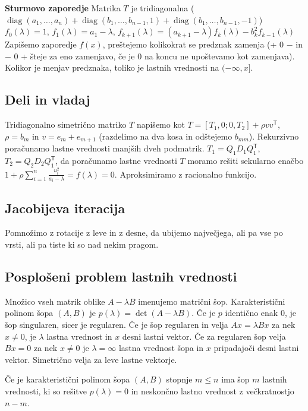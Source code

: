 \documentclass[a4paper,10pt]{article}
\theoremstyle{definition}
\newcommand{\T}{\mathsf{T}\!}
\DeclareMathOperator{\diag}{diag}
\begin{document}
\textbf{Sturmovo zaporedje}
Matrika $T$ je tridiagonalna
($\diag(a_1,\dots,a_n)+\diag(b_1,\dots,b_{n-1},1)+\diag(b_1,\dots,b_{n-1},-1)$)\\
$f_0(\lambda)=1$, $f_1(\lambda)=a_1-\lambda$,
$f_{k+1}(\lambda)=(a_{k+1}-\lambda)f_k(\lambda)-b_k^2f_{k-1}(\lambda)$\\
Zapišemo zaporedje $f(x)$, preštejemo kolikokrat se predznak zamenja
(+ 0 $-$ in $-$ 0 + šteje za eno zamenjavo, če je 0 na koncu ne upoštevamo
kot zamenjava). Kolikor je menjav predznaka, toliko je lastnih
vrednosti na $(-\infty, x]$.

\subsection*{Deli in vladaj}
Tridiagonalno simetrično matriko $T$ napišemo kot $T = [T_1, 0; 0, T_2] + \rho
vv^\T$, $\rho = b_m$ in $v = e_m + e_{m+1}$ (razdelimo na dva kosa in odštejemo
$b_{mm}$). Rekurzivno poračunamo lastne vrednosti manjših dveh podmatrik.
$T_1 = Q_1D_1Q_1^\T$, $T_2 = Q_2D_2Q_1^\T$, da poračunamo lastne vrednosti
$T$ moramo rešiti sekularno enačbo $1 + \rho \sum_{i=1}^n \frac{u_i^2}{a_i -
\lambda} = f(\lambda) = 0$. Aproksimiramo z racionalno funkcijo.

\subsection*{Jacobijeva iteracija}
Pomnožimo z rotacije z leve in z desne, da ubijemo največjega, ali pa vse po
vrsti, ali pa tiste ki so nad nekim pragom.

\subsection*{Posplošeni problem lastnih vrednosti}

Množico vseh matrik oblike $A-\lambda B$ imenujemo matrični šop. Karakteristični
polinom šopa $(A,B)$ je $p(\lambda)=\det (A-\lambda B)$. Če je $p$ identično
enak $0$, je šop singularen, sicer je regularen.
Če je šop regularen in velja $Ax = \lambda Bx$  za nek $x\not=0$, je $\lambda$
lastna vrednost in $x$ desni lastni vektor. Če za regularen šop velja $Bx=0$ za
nek $x\not=0$ je $\lambda=\infty$ lastna vrednost šopa in $x$ pripadajoči desni
lastni vektor.
Simetrično velja za leve lastne vektorje.

Če je karakteristični polinom šopa $(A, B)$ stopnje $m\leq n$ ima šop $m$ lastnih
vrednosti, ki so rešitve $p(\lambda)=0$ in neskončno lastno vrednost z
večkratnostjo $n-m$.
\end{document}
